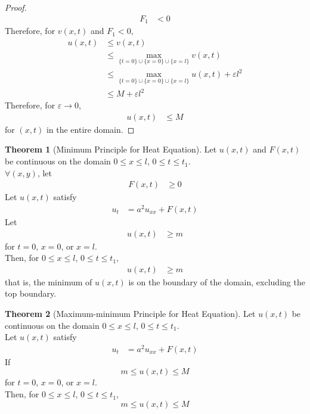 \documentclass[titlepage, fleqn, a4paper, 12pt, twoside]{article}
\theoremstyle{definition}
\theoremstyle{theorem}
\newtheorem{theorem}{Theorem}
\begin{document}
\begin{proof}
\begin{align*}
		F_1 & < 0
	\end{align*}
	Therefore, for $v(x,t)$ and $F_1 < 0$,
	\begin{align*}
		u(x,t) & \le v(x,t)                                                                         \\
                       & \le \max\limits_{\{t = 0\} \cup \{x = 0\} \cup \{x = l\}} v(x,t)                   \\
                       & \le \max\limits_{\{t = 0\} \cup \{x = 0\} \cup \{x = l\}} u(x,t) + \varepsilon l^2 \\
                       & \le M + \varepsilon l^2
	\end{align*}
	Therefore, for $\varepsilon \to 0$,
	\begin{align*}
		u(x,t) & \le M
	\end{align*}
	for $(x,t)$ in the entire domain.
\end{proof}

\begin{theorem}[Minimum Principle for Heat Equation]
	Let $u(x,t)$ and $F(x,t)$ be continuous on the domain $0 \le x \le l$, $0 \le t \le t_1$.\\
	$\forall (x,y)$, let
	\begin{align*}
		F(x,t) & \ge 0
	\end{align*}
	Let $u(x,t)$ satisfy
	\begin{align*}
		u_t & = a^2 u_{x x} + F(x,t)
	\end{align*}
	Let
	\begin{align*}
		u(x,t) & \ge m
	\end{align*}
	for $t = 0$, $x = 0$, or $x = l$.\\
	Then, for $0 \le x \le l$, $0 \le t \le t_1$,
	\begin{align*}
		u(x,t) & \ge m
	\end{align*}
	that is, the minimum of $u(x,t)$ is on the boundary of the domain, excluding the top boundary.
	\label{thm:Minimum_Principle_for_Heat_Equation}
\end{theorem}

\begin{theorem}[Maximum-minimum Principle for Heat Equation]
	Let $u(x,t)$ be continuous on the domain $0 \le x \le l$, $0 \le t \le t_1$.\\
	Let $u(x,t)$ satisfy
	\begin{align*}
		u_t & = a^2 u_{x x} + F(x,t)
	\end{align*}
	If
	\begin{equation*}
		m \le u(x,t) \le M
	\end{equation*}
	for $t = 0$, $x = 0$, or $x = l$.\\
	Then, for $0 \le x \le l$, $0 \le t \le t_1$,
	\begin{equation*}
		m \le u(x,t) \le M
	\end{equation*}
	\label{thm:Maximum-minimum_Principle_for_Heat_Equation}
\end{theorem}
\end{document}
